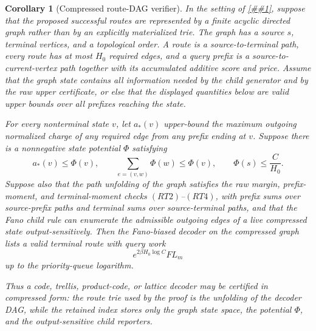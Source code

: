 \documentclass[10pt]{article}
\newcommand{\cref}[1]{\ref{##1}}
\newtheorem{corollary}[theorem]{Corollary}
\theoremstyle{definition}
\begin{document}
\begin{corollary}[Compressed route-DAG verifier]
   \label{cor:compressed-route-dag-verifier}
   In the setting of \cref{cor:finite-accepted-route-trie-compiler}, suppose
   that the proposed successful routes are represented by a finite acyclic
   directed graph rather than by an explicitly materialized trie.  The graph has
   a source \(s\), terminal vertices, and a topological order.  A route is a
   source-to-terminal path, every route has at most \(H_0\) required edges, and
   a query prefix is a source-to-current-vertex path together with its
   accumulated additive score and price.  Assume that the graph state contains
   all information needed by the child generator and by the raw upper
   certificate, or else that the displayed quantities below are valid upper
   bounds over all prefixes reaching the state.

   For every nonterminal state \(v\), let \(a_*(v)\) upper-bound the maximum
   outgoing normalized charge of any required edge from any prefix ending at
   \(v\).  Suppose there is a nonnegative state potential \(\Phi\) satisfying
   \[
      a_*(v)\le\Phi(v),
      \qquad
      \sum_{e=(v,w)}\Phi(w)\le\Phi(v),
      \qquad
      \Phi(s)\le \frac{C}{H_0}.
      \tag{RD1}
   \]
   Suppose also that the path unfolding of the graph satisfies the raw margin,
   prefix-moment, and terminal-moment checks \((RT2)\)--\((RT4)\), with prefix
   sums over source-prefix paths and terminal sums over source-terminal paths,
   and that the Fano child rule can enumerate the admissible outgoing edges of
   a live compressed state output-sensitively.  Then the Fano-biased decoder on
   the compressed graph lists a valid terminal route with query work
   \[
      e^{2\beta H_0\log C}F L_m
   \]
   up to the priority-queue logarithm.

   Thus a code, trellis, product-code, or lattice decoder may be certified in
   compressed form: the route trie used by the proof is the unfolding of the
   decoder DAG, while the retained index stores only the graph state space, the
   potential \(\Phi\), and the output-sensitive child reporters.
\end{corollary}
\end{document}
